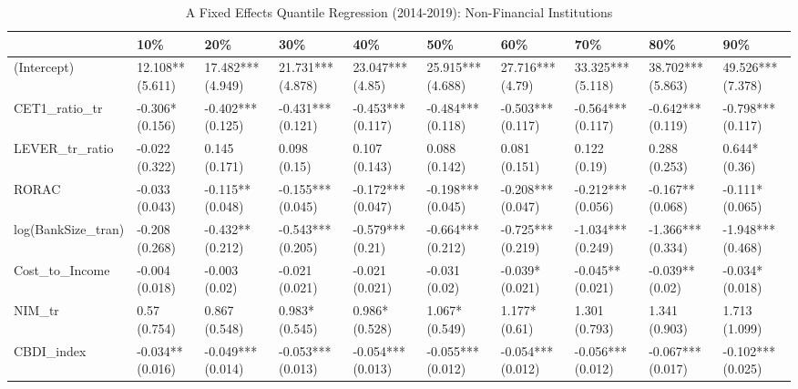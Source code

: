 \begin{table}[ht]
\centering
\caption{A Fixed Effects Quantile Regression (2014-2019): Non-Financial Institutions} 
\begingroup\small
\begin{tabular}{llllllllll}
  \toprule
 & 10\% & 20\% & 30\% & 40\% & 50\% & 60\% & 70\% & 80\% & 90\% \\ 
  \midrule
(Intercept) & 12.108** (5.611) & 17.482*** (4.949) & 21.731*** (4.878) & 23.047*** (4.85) & 25.915*** (4.688) & 27.716*** (4.79) & 33.325*** (5.118) & 38.702*** (5.863) & 49.526*** (7.378) \\ 
  CET1\_ratio\_tr & -0.306* (0.156) & -0.402*** (0.125) & -0.431*** (0.121) & -0.453*** (0.117) & -0.484*** (0.118) & -0.503*** (0.117) & -0.564*** (0.117) & -0.642*** (0.119) & -0.798*** (0.117) \\ 
  LEVER\_tr\_ratio & -0.022 (0.322) & 0.145 (0.171) & 0.098 (0.15) & 0.107 (0.143) & 0.088 (0.142) & 0.081 (0.151) & 0.122 (0.19) & 0.288 (0.253) & 0.644* (0.36) \\ 
  RORAC & -0.033 (0.043) & -0.115** (0.048) & -0.155*** (0.045) & -0.172*** (0.047) & -0.198*** (0.045) & -0.208*** (0.047) & -0.212*** (0.056) & -0.167** (0.068) & -0.111* (0.065) \\ 
  log(BankSize\_tran) & -0.208 (0.268) & -0.432** (0.212) & -0.543*** (0.205) & -0.579*** (0.21) & -0.664*** (0.212) & -0.725*** (0.219) & -1.034*** (0.249) & -1.366*** (0.334) & -1.948*** (0.468) \\ 
  Cost\_to\_Income & -0.004 (0.018) & -0.003 (0.02) & -0.021 (0.021) & -0.021 (0.021) & -0.031 (0.02) & -0.039* (0.021) & -0.045** (0.021) & -0.039** (0.02) & -0.034* (0.018) \\ 
  NIM\_tr & 0.57 (0.754) & 0.867 (0.548) & 0.983* (0.545) & 0.986* (0.528) & 1.067* (0.549) & 1.177* (0.61) & 1.301 (0.793) & 1.341 (0.903) & 1.713 (1.099) \\ 
  CBDI\_index & -0.034** (0.016) & -0.049*** (0.014) & -0.053*** (0.013) & -0.054*** (0.013) & -0.055*** (0.012) & -0.054*** (0.012) & -0.056*** (0.012) & -0.067*** (0.017) & -0.102*** (0.025) \\ 
   \bottomrule
\end{tabular}
\endgroup
\end{table}
